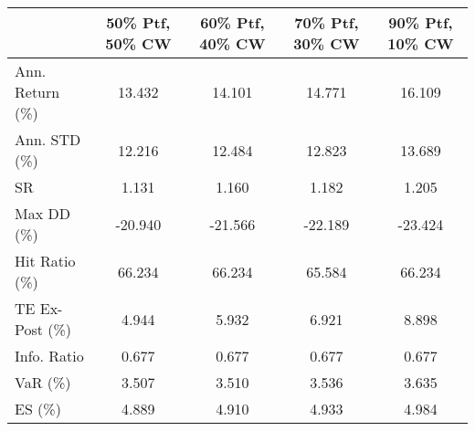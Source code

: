 \begin{tabular}{lcccc}
\toprule
{} &  50\% Ptf, 50\% CW &  60\% Ptf, 40\% CW &  70\% Ptf, 30\% CW &  90\% Ptf, 10\% CW \\
\midrule
Ann. Return (\%) &           13.432 &           14.101 &           14.771 &           16.109 \\
Ann. STD (\%)    &           12.216 &           12.484 &           12.823 &           13.689 \\
SR              &            1.131 &            1.160 &            1.182 &            1.205 \\
Max DD (\%)      &          -20.940 &          -21.566 &          -22.189 &          -23.424 \\
Hit Ratio (\%)   &           66.234 &           66.234 &           65.584 &           66.234 \\
TE Ex-Post (\%)  &            4.944 &            5.932 &            6.921 &            8.898 \\
Info. Ratio     &            0.677 &            0.677 &            0.677 &            0.677 \\
VaR (\%)         &            3.507 &            3.510 &            3.536 &            3.635 \\
ES (\%)          &            4.889 &            4.910 &            4.933 &            4.984 \\
\bottomrule
\end{tabular}
